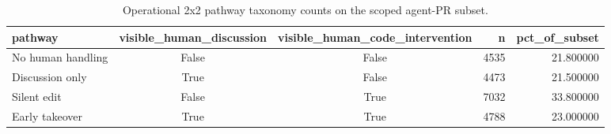 \begin{table}[t]
\centering
\footnotesize
\caption{Operational 2x2 pathway taxonomy counts on the scoped agent-PR subset.}
\label{tab:pathway-2x2-counts}
\begin{tabular}{lccrr}
\toprule
pathway & visible\_human\_discussion & visible\_human\_code\_intervention & n & pct\_of\_subset \\
\midrule
No human handling & False & False & 4535 & 21.800000 \\
Discussion only & True & False & 4473 & 21.500000 \\
Silent edit & False & True & 7032 & 33.800000 \\
Early takeover & True & True & 4788 & 23.000000 \\
\bottomrule
\end{tabular}
\end{table}

